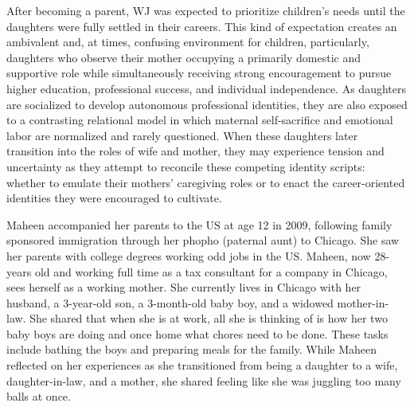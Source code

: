 After becoming a parent, WJ was expected to prioritize children’s needs until the daughters were fully settled in their careers. This kind of expectation creates an ambivalent and, at times, confusing environment for children, particularly, daughters who observe their mother occupying a primarily domestic and supportive role while simultaneously receiving strong encouragement to pursue higher education, professional success, and individual independence. As daughters are socialized to develop autonomous professional identities, they are also exposed to a contrasting relational model in which maternal self-sacrifice and emotional labor are normalized and rarely questioned. When these daughters later transition into the roles of wife and mother, they may experience tension and uncertainty as they attempt to reconcile these competing identity scripts: whether to emulate their mothers’ caregiving roles or to enact the career-oriented identities they were encouraged to cultivate.

Maheen accompanied her parents to the US at age 12 in 2009, following family sponsored immigration through her phopho (paternal aunt) to Chicago. She saw her parents with college degrees working odd jobs in the US. Maheen, now 28-years old and working full time as a tax consultant for a company in Chicago, sees herself as a working mother. She currently lives in Chicago with her husband, a 3-year-old son, a 3-month-old baby boy, and a widowed mother-in-law. She shared that when she is at work, all she is thinking of is how her two baby boys are doing and once home what chores need to be done. These tasks include bathing the boys and preparing meals for the family. While Maheen reflected on her experiences as she transitioned from being a daughter to a wife, daughter-in-law, and a mother, she shared feeling like she was juggling too many balls at once.

